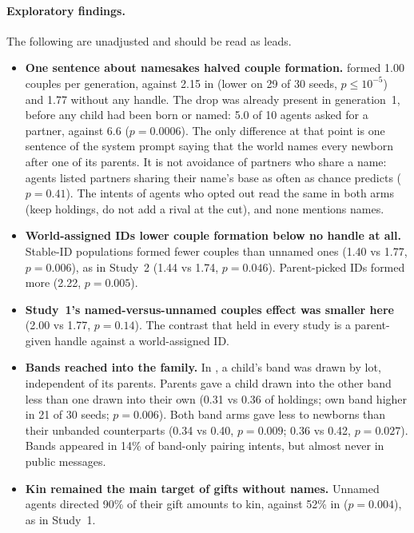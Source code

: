 \paragraph{Exploratory findings.} The following are unadjusted and should be read as leads.
\begin{itemize}
  \item \textbf{One sentence about namesakes halved couple formation.} 
        formed 1.00 couples per generation, against 2.15 in  (lower on
        29 of 30 seeds, $p\le10^{-5}$) and 1.77 without any handle. The drop was already present
        in generation~1, before any child had been born or named: 5.0 of 10 agents asked for a
        partner, against 6.6 ($p=0.0006$). The only difference at that point is one sentence of
        the system prompt saying that the world names every newborn after one of its parents.
        It is not avoidance of partners who share a name: agents listed partners sharing their
        name's base as often as chance predicts ($p=0.41$). The intents of agents who opted out
        read the same in both arms (keep holdings, do not add a rival at the cut), and none
        mentions names.
  \item \textbf{World-assigned IDs lower couple formation below no handle at all.} Stable-ID
        populations formed fewer couples than unnamed ones (1.40 vs 1.77, $p=0.006$), as in
        Study~2 (1.44 vs 1.74, $p=0.046$). Parent-picked IDs formed more (2.22, $p=0.005$).
  \item \textbf{Study~1's named-versus-unnamed couples effect was smaller here} (2.00 vs 1.77,
        $p=0.14$). The contrast that held in every study is a parent-given handle against a
        world-assigned ID.
  \item \textbf{Bands reached into the family.} In , a child's band was drawn by
        lot, independent of its parents. Parents gave a child drawn into the other band less
        than one drawn into their own (0.31 vs 0.36 of holdings; own band higher in 21 of 30
        seeds; $p=0.006$). Both band arms gave less to newborns than their unbanded counterparts
        (0.34 vs 0.40, $p=0.009$; 0.36 vs 0.42, $p=0.027$). Bands appeared in 14\% of
        band-only pairing intents, but almost never in public messages.
  \item \textbf{Kin remained the main target of gifts without names.} Unnamed agents directed
        90\% of their gift amounts to kin, against 52\% in  ($p=0.004$), as in Study~1.
\end{itemize}
